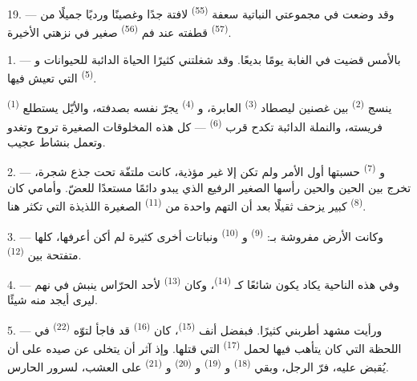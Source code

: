 19. --- وقد وضعت في مجموعتي النباتية سعفة  \textsuperscript{(55)}
لافتة جدًا وغصينًا ورديًا جميلًا من  \textsuperscript{(57)}
قطفته عند فم  \textsuperscript{(56)} صغير في نزهتي الأخيرة.

\VUsaut{3.0mm}
\VUsaut{3.0mm}

\VUsaut{3.0mm}

1. --- بالأمس قضيت في الغابة يومًا بديعًا. وقد شغلتني كثيرًا الحياة
الدائبة للحيوانات و \textsuperscript{(5)} التي تعيش فيها.

 \textsuperscript{(1)} ينسج  \textsuperscript{(2)} بين
غصنين ليصطاد  \textsuperscript{(3)} العابرة، و
\textsuperscript{(4)} يجرّ نفسه بصدفته، والأيّل يستطلع فريسته، والنملة الدائبة
تكدح قرب  \textsuperscript{(6)} --- كل هذه المخلوقات الصغيرة
تروح وتغدو وتعمل بنشاط عجيب.

2. --- و \textsuperscript{(7)} حسبتها أول الأمر  ولم
تكن إلا  غير مؤذية، كانت ملتفّة تحت جذع شجرة، تخرج بين
الحين والحين رأسها الصغير الرفيع الذي يبدو دائمًا مستعدًا للعضّ. وأمامي
كان  \textsuperscript{(8)} كبير يزحف ثقيلًا بعد أن التهم واحدة من
 \textsuperscript{(11)} الصغيرة اللذيذة التي تكثر هنا.

3. --- وكانت الأرض مفروشة بـ: 
\textsuperscript{(9)} و \textsuperscript{(10)} ونباتات أخرى كثيرة لم
أكن أعرفها، كلها متفتحة بين  \textsuperscript{(12)}.

4. --- وفي هذه الناحية يكاد  يكون شائعًا كـ
\textsuperscript{(14)}، وكان  \textsuperscript{(13)} لأحد الحرّاس
ينبش في نهم ليرى أيجد منه شيئًا.

\VUsaut{3.0mm}
\VUsaut{3.0mm}

5. --- ورأيت  مشهد أطربني كثيرًا. فبفضل أنف  \textsuperscript{(15)}، كان  \textsuperscript{(16)} قد
فاجأ لتوّه  \textsuperscript{(22)} في اللحظة التي كان
يتأهب فيها لحمل  \textsuperscript{(17)} التي قتلها. وإذ آثر أن
يتخلى عن صيده على أن يُقبض عليه، فرّ الرجل، وبقي 
\textsuperscript{(18)} و \textsuperscript{(19)} و
\textsuperscript{(20)} و \textsuperscript{(21)} على العشب،
لسرور الحارس.

